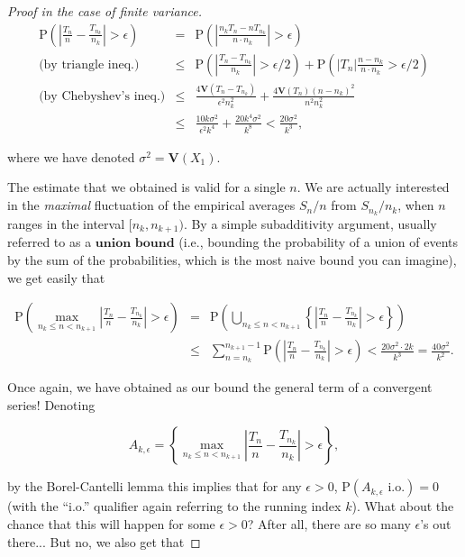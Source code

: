\documentclass[11pt]{report}
\theoremstyle{plain}
\theoremstyle{definition}
\begin{document}
\begin{proof}[Proof in the case of finite variance]
\begin{eqnarray*}
\mathrm{P}\left( \left| \frac{T_n}{n}-\frac{T_{n_k}}{n_k} \right| > \epsilon \right) &=& \mathrm{P}\left( \left|
\frac{n_k T_n - n T_{n_k}}{n\cdot n_k} \right|>\epsilon\right) \\
\textrm{(by triangle ineq.)}  &\le&
\mathrm{P}\left( \left| \frac{T_n -T_{n_k}}{n_k} \right| > \epsilon/2 \right)+ \mathrm{P}\left( \left|T_n\right| \frac{n-n_k}{n\cdot n_k}
> \epsilon/2 \right) \\
\textrm{(by Chebyshev's ineq.)} &\le&
\frac{4 \mathbf{V}(T_n-T_{n_k})}{\epsilon^2 n_k^2} + \frac{4\mathbf{V}(T_n)(n-n_k)^2}{n^2 n_k^2} \\
&\le&
\frac{10 k \sigma^2}{\epsilon^2 k^4} + \frac{20 k^4 \sigma^2}{k^8} < \frac{20 \sigma^2}{k^3},
\end{eqnarray*}

\noindent where we have denoted $\sigma^2=\mathbf{V}(X_1)$.

The estimate that we obtained is valid for a single
$n$. We are actually interested in the \emph{maximal}
fluctuation of the empirical averages $S_n/n$ from
$S_{n_k}/n_k$, when $n$ ranges in the interval
$[n_k,n_{k+1})$. By a simple subadditivity argument,
usually referred to as a $\textbf{union bound}$
(i.e., bounding the probability of a union of events
by the sum of the probabilities, which is the most
naive bound you can imagine), we get easily that

\begin{eqnarray*}
\mathrm{P}\left(\max_{n_k \le n < n_{k+1}} \left| \frac{T_n}{n} - \frac{T_{n_k}}{n_k} \right| > \epsilon \right)
&=&
\mathrm{P}\left(\bigcup_{n_k \le n < n_{k+1}} \left\{\left| \frac{T_n}{n} - \frac{T_{n_k}}{n_k} \right| > \epsilon \right\}\right) \\
&\le& \sum_{n=n_k}^{n_{k+1}-1}
\mathrm{P}\left(\left| \frac{T_n}{n} - \frac{T_{n_k}}{n_k} \right| > \epsilon \right) < \frac{20 \sigma^2\cdot 2k}{k^3}
= \frac{40\sigma^2}{k^2}.
\end{eqnarray*}

\noindent Once again, we have obtained as our bound the general
term of a convergent series! Denoting

\[
A_{k,\epsilon} = \left\{ \max_{n_k \le n < n_{k+1}} \left| \frac{T_n}{n} - \frac{T_{n_k}}{n_k} \right| > \epsilon
\right\},
\]

\noindent by the Borel-Cantelli lemma this implies that for any
$\epsilon>0$,
$\mathrm{P}(A_{k,\epsilon}\textrm{ i.o.})=0$ (with
the ``i.o.'' qualifier again referring to the running
index $k$). What about the chance that this will
happen for some $\epsilon>0$? After all, there are so
many $\epsilon$'s out there... But no, we also get
that


\end{proof}
\end{document}
